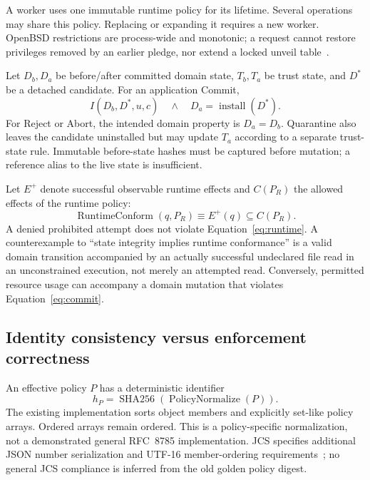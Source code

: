 \documentclass[electronics,article,submit,pdftex,moreauthors]{Definitions/mdpi}
\begin{document}
A worker uses one immutable runtime policy for its lifetime. Several operations may share this policy. Replacing or expanding it requires a new worker. OpenBSD restrictions are process-wide and monotonic; a request cannot restore privileges removed by an earlier pledge, nor extend a locked unveil table~\cite{openbsd79pledge,openbsd79unveil}.

Let $D_b,D_a$ be before/after committed domain state, $T_b,T_a$ be trust state, and $D^*$ be a detached candidate. For an application Commit,
\begin{equation}
I(D_b,D^*,u,c)\quad\land\quad D_a=\operatorname{install}(D^*).\label{eq:commit}
\end{equation}
For Reject or Abort, the intended domain property is $D_a=D_b$. Quarantine also leaves the candidate uninstalled but may update $T_a$ according to a separate trust-state rule. Immutable before-state hashes must be captured before mutation; a reference alias to the live state is insufficient.

Let $E^+$ denote successful observable runtime effects and $C(P_R)$ the allowed effects of the runtime policy:
\begin{equation}
\operatorname{RuntimeConform}(q,P_R)\equiv E^+(q)\subseteq C(P_R).\label{eq:runtime}
\end{equation}
A denied prohibited attempt does not violate Equation~\eqref{eq:runtime}. A counterexample to ``state integrity implies runtime conformance'' is a valid domain transition accompanied by an actually successful undeclared file read in an unconstrained execution, not merely an attempted read. Conversely, permitted resource usage can accompany a domain mutation that violates Equation~\eqref{eq:commit}.

\subsection{Identity consistency versus enforcement correctness}
An effective policy $P$ has a deterministic identifier
\begin{equation}
h_P=\operatorname{SHA256}(\operatorname{PolicyNormalize}(P)).\label{eq:policy_digest}
\end{equation}
The existing implementation sorts object members and explicitly set-like policy arrays. Ordered arrays remain ordered. This is a policy-specific normalization, not a demonstrated general RFC~8785 implementation. JCS specifies additional JSON number serialization and UTF-16 member-ordering requirements~\cite{rundgren2020jcs}; no general JCS compliance is inferred from the old golden policy digest.
\end{document}
